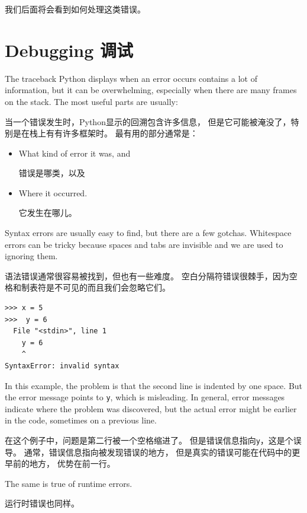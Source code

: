 \documentclass[10pt]{book}
\begin{document}
\begin{CJK}{UTF8}{gbsn}
我们后面将会看到如何处理这类错误。

\section{Debugging 调试}
\label{whitespace}

The traceback Python displays when an error occurs contains
a lot of information, but it can be overwhelming, especially
when there are many frames on the stack.  The most
useful parts are usually:

当一个错误发生时，Python显示的回溯包含许多信息，
但是它可能被淹没了，特别是在栈上有有许多框架时。
最有用的部分通常是：

\begin{itemize}

\item What kind of error it was, and

错误是哪类，以及

\item Where it occurred.

它发生在哪儿。

\end{itemize}

Syntax errors are usually easy to find, but there are a few
gotchas.  Whitespace errors can be tricky because spaces and
tabs are invisible and we are used to ignoring them.

语法错误通常很容易被找到，但也有一些难度。
空白分隔符错误很棘手，因为空格和制表符是不可见的而且我们会忽略它们。

\begin{verbatim}
>>> x = 5
>>>  y = 6
  File "<stdin>", line 1
    y = 6
    ^
SyntaxError: invalid syntax
\end{verbatim}
%
In this example, the problem is that the second line is indented by
one space.  But the error message points to {\tt y}, which is
misleading.  In general, error messages indicate where the problem was
discovered, but the actual error might be earlier in the code,
sometimes on a previous line.

在这个例子中，问题是第二行被一个空格缩进了。
但是错误信息指向{\tt y}，这是个误导。
通常，错误信息指向被发现错误的地方，
但是真实的错误可能在代码中的更早前的地方，
优势在前一行。

The same is true of runtime errors.  

运行时错误也同样。


\end{CJK}
\end{document}
